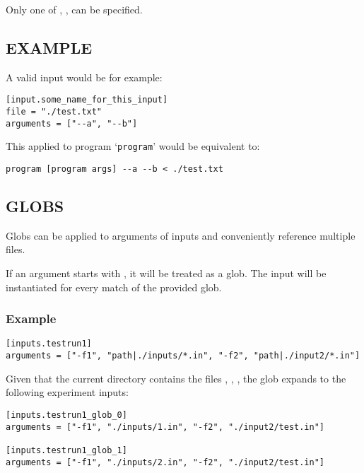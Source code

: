 \documentclass[a4paper,english]{article}
\begin{document}
\begin{adjustwidth}{18pt}{0pt}
        Only one of , ,  can be specified.

        \subsection{EXAMPLE}
            A valid input would be for example:

            \begin{verbatim}
[input.some_name_for_this_input]
file = "./test.txt"
arguments = ["--a", "--b"]
            \end{verbatim}
            This applied to program `\texttt{program}' would be equivalent to:

            \begin{verbatim}
program [program args] --a --b < ./test.txt
            \end{verbatim}


      \subsection{GLOBS}

        Globs can be applied to arguments of inputs and conveniently reference multiple files.

        If an argument starts with , it will be treated as a glob.
        The input will be instantiated for every match of the provided glob.

        \subsubsection{Example}

            \begin{verbatim}
[inputs.testrun1]
arguments = ["-f1", "path|./inputs/*.in", "-f2", "path|./input2/*.in"]
            \end{verbatim}

            Given that the current directory contains the files
            , , , the glob
            expands to the following experiment inputs:

            \begin{verbatim}
[inputs.testrun1_glob_0]
arguments = ["-f1", "./inputs/1.in", "-f2", "./input2/test.in"]

[inputs.testrun1_glob_1]
arguments = ["-f1", "./inputs/2.in", "-f2", "./input2/test.in"]
            \end{verbatim}


\end{adjustwidth}
\end{document}
